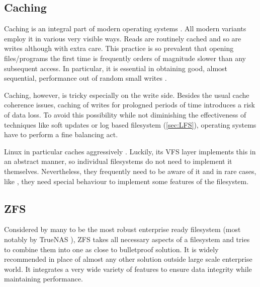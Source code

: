         \subsection{Caching}

            Caching is an integral part of modern operating systems
            \cite{IO_bottleneck, LFS, LFS, FFS}. All modern
            variants employ it in various very visible ways. Reads are
            routinely cached and so are writes although with extra care. This
            practice is so prevalent that opening files/programs the first time
            is frequently orders of magnitude slower than any subsequent
            access. In particular, it is essential in obtaining good, almost
            sequential, performance out of random small writes
            \cite{soft_updates, LFS}.

            Caching, however, is tricky especially on the write side. Besides
            the usual cache coherence issues, caching of writes for prologned
            periods of time introduces a risk of data loss. To avoid this
            possibility while not diminishing the effectiveness of techniques
            like soft updates \cite{soft_updates} or log based filesystem
            (\autoref{sec:LFS}), operating systems have to perform a fine balancing
            act.

            Linux in particular caches aggressively \cite{Linux_VFS_cache}.
            Luckily, its VFS layer implements this in an abstract manner, so
            individual filesystems do not need to implement it themselves.
            Nevertheless, they frequently need to be aware of it and in rare
            cases, like , they need special behaviour to
            implement some features of the filesystem.

        \subsection{ZFS}
            \label{sec:ZFS}

            Considered by many to be the most robust enterprise ready
            filesystem \cite{ZFS_reliability} (most notably by TrueNAS
            \cite{TrueNAS_enterprise}), ZFS takes all necessary aspects of a
            filesystem and tries to combine them into one as close to
            bulletproof solution. It is widely recommended in place of almost
            any other solution outside large scale enterprise world. It
            integrates a very wide variety of features to ensure data integrity
            while maintaining performance.

